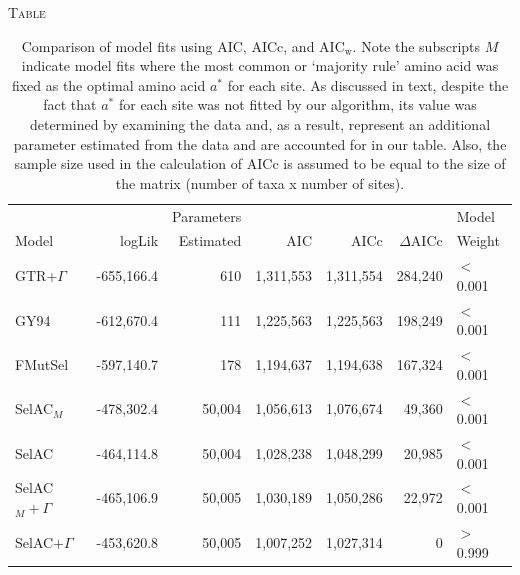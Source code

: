\documentclass[12pt,letterpaper,fleqn]{article}
\renewcommand{\section}[1]{%
\bigskip
\begin{center}
\begin{Large}
\normalfont\scshape #1
\medskip
\end{Large}
\end{center}}
\newcommand{\DeltaAICc}{\ensuremath{\Delta\text{AICc}}\xspace}
\newcommand{\AICw}{\ensuremath{\text{AIC}_\text{w}}\xspace}
\newcommand{\selac}{SelAC\xspace}
\newcommand{\selacplusgamma}{SelAC$+\Gamma$\xspace}
\newcommand{\selacmaj}{SelAC$_{M}$\xspace}
\newcommand{\selacmajplusgamma}{SelAC$_{M}+\Gamma$\xspace}
\newcommand{\aopt}{\ensuremath{a^*}\xspace}
\begin{document}


\renewcommand\refname{\begin{center}{\normalfont\scshape References}\end{center}}



\clearpage

\section{Table}

  \begin{table}[H]
    \begin{tabular}{lrrrrrl}
                                &                  &Parameters &              &              &            &    Model\\
      Model                     & logLik   & Estimated &           AIC&          AICc&  \DeltaAICc&  Weight\\\hline
      GTR+$\Gamma$              & -655,166.4&       610&      1,311,553&     1,311,554&     284,240&        $<$0.001\\
      GY94                      & -612,670.4&       111&      1,225,563&     1,225,563&     198,249&           $<$0.001\\
      FMutSel                   & -597,140.7&       178&      1,194,637&     1,194,638&     167,324&           $<$0.001\\
      \selacmaj                 & -478,302.4&       50,004&   1,056,613&     1,076,674&      49,360&          $<$0.001\\
      \selac                    & -464,114.8&       50,004&   1,028,238&     1,048,299&      20,985&          $<$0.001\\
      \selacmajplusgamma        & -465,106.9&       50,005&   1,030,189&     1,050,286&      22,972&          $<$0.001\\
      \selacplusgamma           & -453,620.8&       50,005&   1,007,252&     1,027,314&           0&          $>$0.999\\
    \end{tabular}
    \caption{Comparison of model fits using AIC, AICc, and \AICw.
Note the subscripts $M$ indicate model fits where the most common or `majority rule' amino acid was fixed as the optimal amino acid \aopt for each site.
As discussed in text, despite the fact that \aopt for each site was not fitted by our algorithm, its value was determined by examining the data and, as a result, represent an additional parameter estimated from the data and are accounted for in our table.
Also, the sample size used in the calculation of AICc is assumed to be equal to the size of the matrix (number of taxa x number of sites).
}
    \label{table:modelFits}
\end{table}
\end{document}
